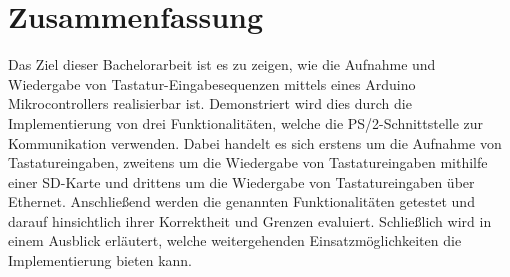 \chapter*{Zusammenfassung}
Das Ziel dieser Bachelorarbeit ist es zu zeigen, wie die Aufnahme und Wiedergabe von Tastatur-Eingabesequenzen mittels eines Arduino Mikrocontrollers realisierbar ist. Demonstriert wird dies durch die Implementierung von drei Funktionalitäten, welche die PS/2-Schnittstelle zur Kommunikation verwenden. Dabei handelt es sich erstens um die Aufnahme von Tastatureingaben, zweitens um die Wiedergabe von Tastatureingaben mithilfe einer SD-Karte und drittens um die Wiedergabe von Tastatureingaben über Ethernet. Anschließend werden die genannten Funktionalitäten getestet und darauf hinsichtlich ihrer Korrektheit und Grenzen evaluiert. Schließlich wird in einem Ausblick erläutert, welche weitergehenden Einsatzmöglichkeiten die Implementierung bieten kann.